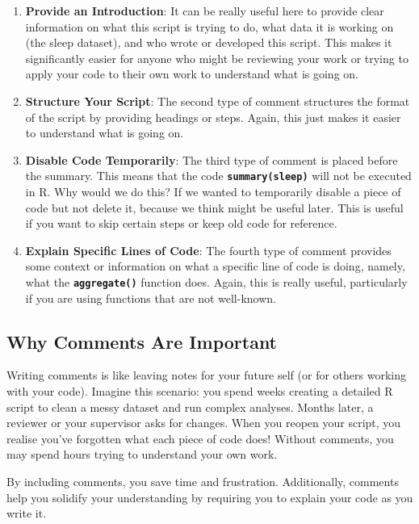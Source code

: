 \documentclass[
]{book}
\begin{document}
\begin{enumerate}
\def\labelenumi{\arabic{enumi}.}
\item
  \textbf{Provide an Introduction}: It can be really useful here to provide clear information on what this script is trying to do, what data it is working on (the sleep dataset), and who wrote or developed this script. This makes it significantly easier for anyone who might be reviewing your work or trying to apply your code to their own work to understand what is going on.
\item
  \textbf{Structure Your Script}: The second type of comment structures the format of the script by providing headings or steps. Again, this just makes it easier to understand what is going on.
\item
  \textbf{Disable Code Temporarily}: The third type of comment is placed before the summary. This means that the code \textbf{\texttt{summary(sleep)}} will not be executed in R. Why would we do this? If we wanted to temporarily disable a piece of code but not delete it, because we think might be useful later. This is useful if you want to skip certain steps or keep old code for reference.
\item
  \textbf{Explain Specific Lines of Code}: The fourth type of comment provides some context or information on what a specific line of code is doing, namely, what the \textbf{\texttt{aggregate()}} function does. Again, this is really useful, particularly if you are using functions that are not well-known.
\end{enumerate}

\subsection{Why Comments Are Important}\label{why-comments-are-important}

Writing comments is like leaving notes for your future self (or for others working with your code). Imagine this scenario: you spend weeks creating a detailed R script to clean a messy dataset and run complex analyses. Months later, a reviewer or your supervisor asks for changes. When you reopen your script, you realise you've forgotten what each piece of code does! Without comments, you may spend hours trying to understand your own work.

By including comments, you save time and frustration. Additionally, comments help you solidify your understanding by requiring you to explain your code as you write it.
\end{document}
